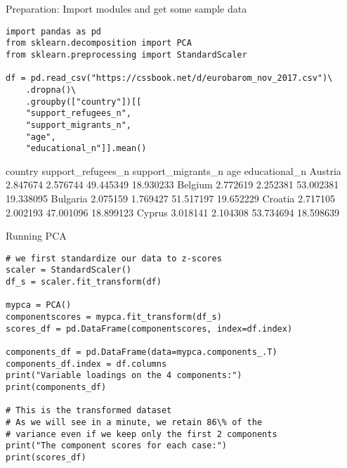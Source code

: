 \begin{frame}{Preparation: Import modules and get some sample data}
\begin{verbatim}
import pandas as pd
from sklearn.decomposition import PCA
from sklearn.preprocessing import StandardScaler

df = pd.read_csv("https://cssbook.net/d/eurobarom_nov_2017.csv")\
    .dropna()\
    .groupby(["country"])[[
    "support_refugees_n", 
    "support_migrants_n", 
    "age", 
    "educational_n"]].mean()
\end{verbatim}


\begin{lstlistingoutputtiny}
country   support_refugees_n  support_migrants_n        age  educational_n                                                                
Austria             2.847674            2.576744  49.445349      18.930233
Belgium             2.772619            2.252381  53.002381      19.338095
Bulgaria            2.075159            1.769427  51.517197      19.652229
Croatia             2.717105            2.002193  47.001096      18.899123
Cyprus              3.018141            2.104308  53.734694      18.598639
\end{lstlistingoutputtiny}
\end{frame}






\begin{frame}{Running PCA}
  \begin{verbatim}
# we first standardize our data to z-scores
scaler = StandardScaler()
df_s = scaler.fit_transform(df) 
    
mypca = PCA()
componentscores = mypca.fit_transform(df_s)
scores_df = pd.DataFrame(componentscores, index=df.index)

components_df = pd.DataFrame(data=mypca.components_.T)
components_df.index = df.columns
print("Variable loadings on the 4 components:")
print(components_df)  

# This is the transformed dataset
# As we will see in a minute, we retain 86\% of the
# variance even if we keep only the first 2 components
print("The component scores for each case:")
print(scores_df)
\end{verbatim}
\end{frame}



